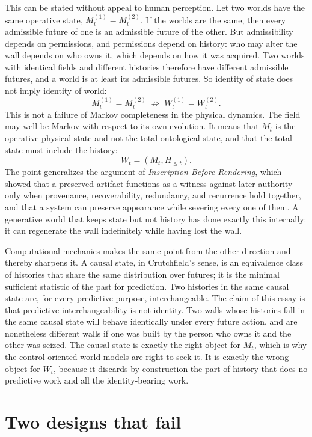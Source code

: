 \documentclass[11pt]{article}
\begin{document}
This can be stated without appeal to human perception. Let two worlds have the same operative state, $M_t^{(1)} = M_t^{(2)}$. If the worlds are the same, then every admissible future of one is an admissible future of the other. But admissibility depends on permissions, and permissions depend on history: who may alter the wall depends on who owns it, which depends on how it was acquired. Two worlds with identical fields and different histories therefore have different admissible futures, and a world is at least its admissible futures. So identity of state does not imply identity of world:
\[
M_t^{(1)} = M_t^{(2)} \;\not\Rightarrow\; W_t^{(1)} = W_t^{(2)}.
\]
This is not a failure of Markov completeness in the physical dynamics. The field may well be Markov with respect to its own evolution. It means that $M_t$ is the operative physical state and not the total ontological state, and that the total state must include the history:
\[
W_t = (M_t, H_{\leq t}).
\]
The point generalizes the argument of \emph{Inscription Before Rendering}, which showed that a preserved artifact functions as a witness against later authority only when provenance, recoverability, redundancy, and recurrence hold together, and that a system can preserve appearance while severing every one of them. A generative world that keeps state but not history has done exactly this internally: it can regenerate the wall indefinitely while having lost the wall.

Computational mechanics makes the same point from the other direction and thereby sharpens it. A causal state, in Crutchfield's sense, is an equivalence class of histories that share the same distribution over futures; it is the minimal sufficient statistic of the past for prediction. Two histories in the same causal state are, for every predictive purpose, interchangeable. The claim of this essay is that predictive interchangeability is not identity. Two walls whose histories fall in the same causal state will behave identically under every future action, and are nonetheless different walls if one was built by the person who owns it and the other was seized. The causal state is exactly the right object for $M_t$, which is why the control-oriented world models are right to seek it. It is exactly the wrong object for $W_t$, because it discards by construction the part of history that does no predictive work and all the identity-bearing work.

\section{Two designs that fail}
\end{document}
